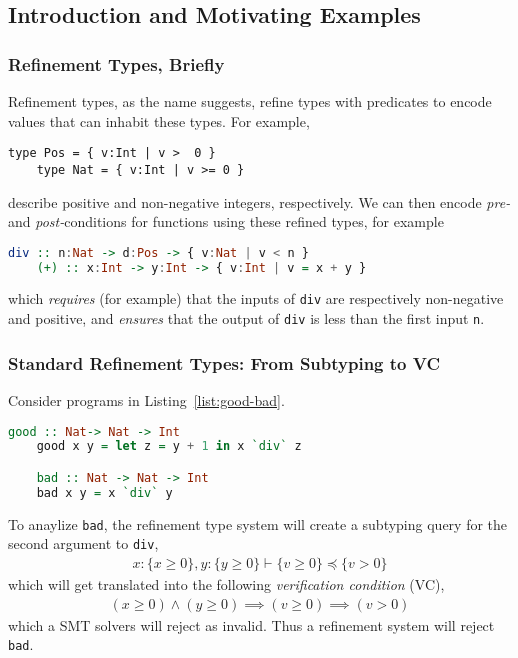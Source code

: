 \documentclass[a4paper,UKenglish]{lipics-v2016}
\begin{document}
\subsection{Introduction and Motivating Examples}
\subsubsection{Refinement Types, Briefly}
Refinement types, as the name suggests, refine types with predicates to encode
values that can inhabit these types.  For example,
\begin{lstlisting}[abovecaptionskip=-\medskipamount]
    type Pos = { v:Int | v >  0 }
    type Nat = { v:Int | v >= 0 }
\end{lstlisting}
describe positive and non-negative integers, respectively.  We can then encode
\emph{pre-} and \emph{post-}conditions for functions using these refined types,
for example
\begin{lstlisting}[language=haskell,abovecaptionskip=-\medskipamount]
    div :: n:Nat -> d:Pos -> { v:Nat | v < n } 
    (+) :: x:Int -> y:Int -> { v:Int | v = x + y }
\end{lstlisting}
which \emph{requires} (for example) that the inputs of \texttt{div} are
respectively non-negative and positive, and \emph{ensures} that the output of
\texttt{div} is less than the first input \texttt{n}.

\subsubsection{Standard Refinement Types: From Subtyping to VC}
Consider programs in Listing~\ref{list:good-bad}.
\begin{lstlisting}[caption={Simple Example},float,captionpos=t,label={list:good-bad},language=haskell,abovecaptionskip=-\medskipamount]
    good :: Nat-> Nat -> Int
    good x y = let z = y + 1 in x `div` z

    bad :: Nat -> Nat -> Int
    bad x y = x `div` y
\end{lstlisting}
To anaylize \texttt{bad}, the refinement type system will create a subtyping
query for the second argument to \texttt{div},
\begin{align*}
    x:\{x\geq0\}, y:\{y\geq0\}\vdash\{v\geq0\}\preceq\{v>0\}
\end{align*}
which will get translated into the following \emph{verification condition}
(VC),
\begin{align*}
    (x\geq0)\wedge(y\geq0)\implies(v\geq0)\implies(v>0)
\end{align*}
which a SMT solvers will reject as invalid.  Thus a refinement system will
reject \texttt{bad}.
\end{document}
